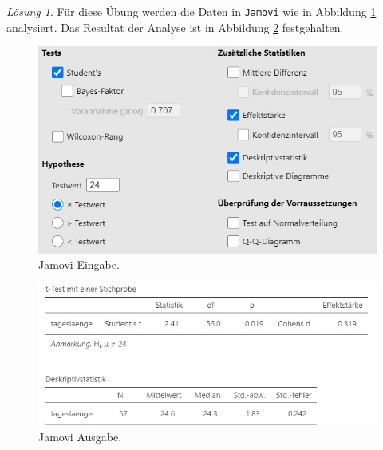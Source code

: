 \documentclass[
]{book}
\theoremstyle{definition}
\theoremstyle{definition}
\theoremstyle{definition}
\theoremstyle{definition}
\theoremstyle{remark}
\newtheorem*{solution}{Lösung}
\begin{document}
\begin{solution}

Für diese Übung werden die Daten in \texttt{Jamovi} wie in Abbildung \ref{fig:sol-circadian-input} analysiert. Das Resultat der Analyse ist in Abbildung \ref{fig:sol-circadian-output} festgehalten.

\begin{figure}
\includegraphics[width=1\linewidth]{figures/05-exr-circadian-jmv-input} \caption{Jamovi Eingabe.}\label{fig:sol-circadian-input}
\end{figure}

\begin{figure}
\includegraphics[width=1\linewidth]{figures/05-exr-circadian-jmv-output} \caption{Jamovi Ausgabe.}\label{fig:sol-circadian-output}
\end{figure}


\end{solution}
\end{document}
